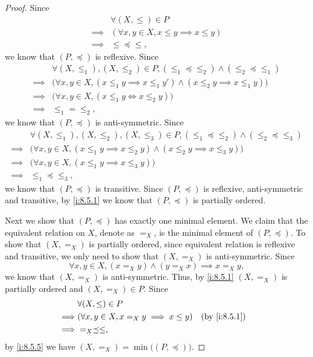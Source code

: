 \begin{proof}
  Since
  \begin{align*}
             & \forall (X, \leq) \in P                          \\
    \implies & (\forall x, y \in X, x \leq y \implies x \leq y) \\
    \implies & \leq \preceq \leq,
  \end{align*}
  we know that \((P, \preceq)\) is reflexive.
  Since
  \begin{align*}
             & \forall (X, \leq_1), (X, \leq_2) \in P, (\leq_1 \preceq \leq_2) \land (\leq_2 \preceq \leq_1)          \\
    \implies & \big(\forall x, y \in X, (x \leq_1 y \implies x \leq_1 y') \land (x \leq_2 y \implies x \leq_1 y)\big) \\
    \implies & \big(\forall x, y \in X, (x \leq_1 y \iff x \leq_2 y)\big)                                             \\
    \implies & \leq_1 = \leq_2,
  \end{align*}
  we know that \((P, \preceq)\) is anti-symmetric.
  Since
  \begin{align*}
             & \forall (X, \leq_1), (X, \leq_2), (X, \leq_3) \in P, (\leq_1 \preceq \leq_2) \land (\leq_2 \preceq \leq_3) \\
    \implies & \big(\forall x, y \in X, (x \leq_1 y \implies x \leq_2 y) \land (x \leq_2 y \implies x \leq_3 y)\big)      \\
    \implies & \big(\forall x, y \in X, (x \leq_1 y \implies x \leq_3 y)\big)                                             \\
    \implies & \leq_1 \preceq \leq_3,
  \end{align*}
  we know that \((P, \preceq)\) is transitive.
  Since \((P, \preceq)\) is reflexive, anti-symmetric and transitive, by \cref{i:8.5.1} we know that \((P, \preceq)\) is partially ordered.

  Next we show that \((P, \preceq)\) has exactly one minimal element.
  We claim that the equivalent relation on \(X\), denote as \(=_X\), is the minimal element of \((P, \preceq)\).
  To show that \((X, =_X)\) is partially ordered, since equivalent relation is reflexive and transitive, we only need to show that \((X, =_X)\) is anti-symmetric.
  Since
  \[
    \forall x, y \in X, (x =_X y) \land (y =_X x) \implies x =_X y,
  \]
  we know that \((X, =_X)\) is anti-symmetric.
  Thus, by \cref{i:8.5.1} \((X, =_X)\) is partially ordered and \((X, =_X) \in P\).
  Since
  \begin{align*}
             & \forall (X, \leq) \in P                                           \\
    \implies & (\forall x, y \in X, x =_X y \implies x \leq y) &  & \by{i:8.5.1} \\
    \implies & =_X \preceq \leq,
  \end{align*}
  by \cref{i:8.5.5} we have \((X, =_X) = \min\big((P, \preceq)\big)\).


\end{proof}
